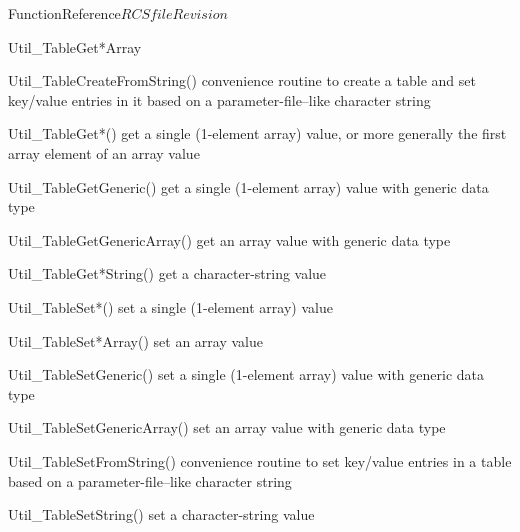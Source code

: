\begin{cactuspart}{FunctionReference}{$RCSfile$}{$Revision$}
\begin{FunctionDescription}{Util\_TableGet*Array}
\begin{SeeAlsoSection}
\begin{SeeAlso}{Util\_TableCreateFromString()}
convenience routine to create a table and set key/value entries
in it based on a parameter-file--like character string
\end{SeeAlso}
\begin{SeeAlso}{Util\_TableGet*()}
get a single (1-element array) value,
or more generally the first array element of an array value
\end{SeeAlso}
\begin{SeeAlso}{Util\_TableGetGeneric()}
get a single (1-element array) value with generic data type
\end{SeeAlso}
\begin{SeeAlso}{Util\_TableGetGenericArray()}
get an array value with generic data type
\end{SeeAlso}
\begin{SeeAlso}{Util\_TableGet*String()}
get a character-string value
\end{SeeAlso}
\begin{SeeAlso}{Util\_TableSet*()}
set a single (1-element array) value
\end{SeeAlso}
\begin{SeeAlso}{Util\_TableSet*Array()}
set an array value
\end{SeeAlso}
\begin{SeeAlso}{Util\_TableSetGeneric()}
set a single (1-element array) value with generic data type
\end{SeeAlso}
\begin{SeeAlso}{Util\_TableSetGenericArray()}
set an array value with generic data type
\end{SeeAlso}
\begin{SeeAlso}{Util\_TableSetFromString()}
convenience routine to set key/value entries in a table based on a
parameter-file--like character string
\end{SeeAlso}
\begin{SeeAlso}{Util\_TableSetString()}
set a character-string value
\end{SeeAlso}
\end{SeeAlsoSection}


\end{FunctionDescription}
\end{cactuspart}
